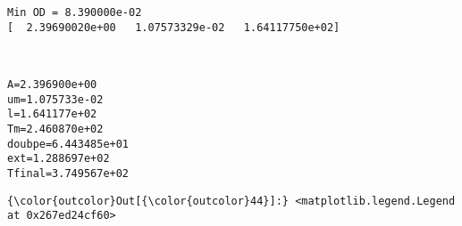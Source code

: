 \documentclass[11pt]{article}
\begin{document}
    \begin{Verbatim}[commandchars=\\\{\}]
Min OD = 8.390000e-02
[  2.39690020e+00   1.07573329e-02   1.64117750e+02]

    \end{Verbatim}

    \begin{center}
    \end{center}
    { \hspace*{\fill} \\}
    
    \begin{Verbatim}[commandchars=\\\{\}]
A=2.396900e+00
um=1.075733e-02
l=1.641177e+02
Tm=2.460870e+02
doubpe=6.443485e+01
ext=1.288697e+02
Tfinal=3.749567e+02

    \end{Verbatim}

            \begin{Verbatim}[commandchars=\\\{\}]
{\color{outcolor}Out[{\color{outcolor}44}]:} <matplotlib.legend.Legend at 0x267ed24cf60>
\end{Verbatim}
        
    \begin{center}
    \end{center}
    { \hspace*{\fill} \\}
    
    \begin{center}
    \end{center}
    { \hspace*{\fill} \\}
    
\end{document}
